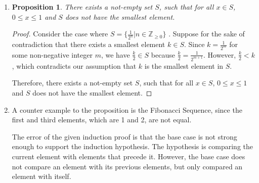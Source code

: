 \documentclass{article}
\newtheorem{prop}[thm]{Proposition}
\begin{document}
\begin{enumerate}
\begin{proof}
    Suppose $S$ is a subset of $\mathbb{Z}_{> 0}$, which has no smallest element. We will prove that $S$ is empty. To do so, we will show by strong induction on n that for all $n \geq 1$, we have $n \notin S$.

    If $n = 1$, $n$ cannot be in $S$ because if $1 \in S$, then 
    $1$ will be the smallest integer in $S$, as it is the smallest positive integer.

    Let $k \in \mathbb{Z}_{> 0}$. Suppose for all integer $m$ where $0 < m \leq k$, we have $m \notin S$. We will show that $k + 1 \notin S$.

    Since there are no positive integers that are smaller than $k + 1$ in $S$, $k + 1 \notin S$ because if $k + 1 \in S$, then it would be the smallest element in $S$.

    Thus, $k + 1 \notin S$ if $m \notin S$ for all integer $m$ where $0 < m \leq k$.

    Therefore, $S$ is empty.
\end{proof}

\item 
\begin{prop}
    There exists a not-empty set $S$, such that for all $x \in S$, $0 \leq x \leq 1$ and $S$ does not have the smallest element.
\end{prop}
\begin{proof}
    Consider the case where $S = \{\frac{1}{2^n}|n \in \mathbb{Z}_{\geq 0}\}$ . Suppose for the sake of contradiction that there exists a smallest element $k \in S$. Since $k = \frac{1}{2^m}$ for some non-negative integer $m$, we have $\frac{k}{2} \in S$ because $\frac{k}{2} = \frac{1}{2^{m+1}}$. However, $\frac{k}{2} < k$, which contradicts our assumption that $k$ is the smallest element in $S$. 

    Therefore, there exists a not-empty set $S$, such that for all $x \in S$, $0 \leq x \leq 1$ and $S$ does not have the smallest element.
\end{proof}

\item 
A counter example to the proposition is the Fibonacci Sequence, since the first and third elements, which are 1 and 2, are not equal.

The error of the given induction proof is that the base case is not strong enough to support the induction hypothesis. The hypothesis is comparing the current element with elements that precede it. However, the base case does not compare an element with its previous elements, but only compared an element with itself.


\end{enumerate}
\end{document}
